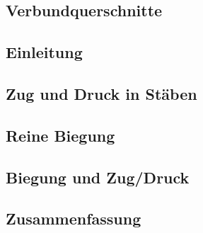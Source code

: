 \documentclass[11pt]{article}
\newcommand{\1}{ {\mathds{1}} }
\begin{document}
\begin{multicols}{2}
		\section{Verbundquerschnitte}
		\subsection{Einleitung}
		\subsection{Zug und Druck in Stäben}
		\subsection{Reine Biegung}
		\subsection{Biegung und Zug/Druck}
		\subsection{Zusammenfassung}
	\end{multicols}
\end{document}
